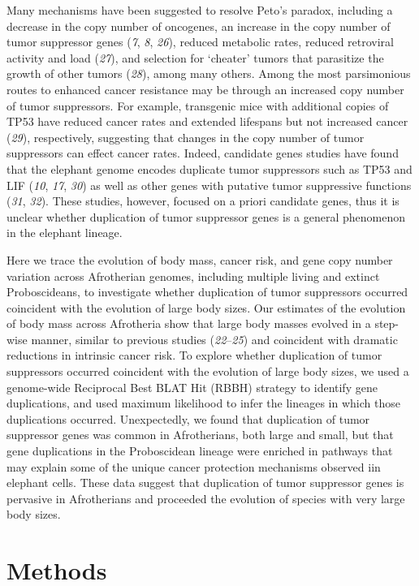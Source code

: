 \documentclass[]{elsarticle} %
\begin{document}
Many mechanisms have been suggested to resolve Peto's paradox, including a decrease in the copy number of oncogenes, an increase in the copy number of tumor suppressor genes (\emph{7}, \emph{8}, \emph{26}), reduced metabolic rates, reduced retroviral activity and load (\emph{27}), and selection for `cheater' tumors that parasitize the growth of other tumors (\emph{28}), among many others. Among the most parsimonious routes to enhanced cancer resistance may be through an increased copy number of tumor suppressors. For example, transgenic mice with additional copies of TP53 have reduced cancer rates and extended lifespans but not increased cancer (\emph{29}), respectively, suggesting that changes in the copy number of tumor suppressors can effect cancer rates. Indeed, candidate genes studies have found that the elephant genome encodes duplicate tumor suppressors such as TP53 and LIF (\emph{10}, \emph{17}, \emph{30}) as well as other genes with putative tumor suppressive functions (\emph{31}, \emph{32}). These studies, however, focused on a priori candidate genes, thus it is unclear whether duplication of tumor suppressor genes is a general phenomenon in the elephant lineage.

Here we trace the evolution of body mass, cancer risk, and gene copy number variation across Afrotherian genomes, including multiple living and extinct Proboscideans, to investigate whether duplication of tumor suppressors occurred coincident with the evolution of large body sizes. Our estimates of the evolution of body mass across Afrotheria show that large body masses evolved in a step-wise manner, similar to previous studies (\emph{22}--\emph{25}) and coincident with dramatic reductions in intrinsic cancer risk. To explore whether duplication of tumor suppressors occurred coincident with the evolution of large body sizes, we used a genome-wide Reciprocal Best BLAT Hit (RBBH) strategy to identify gene duplications, and used maximum likelihood to infer the lineages in which those duplications occurred. Unexpectedly, we found that duplication of tumor suppressor genes was common in Afrotherians, both large and small, but that gene duplications in the Proboscidean lineage were enriched in pathways that may explain some of the unique cancer protection mechanisms observed iin elephant cells. These data suggest that duplication of tumor suppressor genes is pervasive in Afrotherians and proceeded the evolution of species with very large body sizes.

\hypertarget{methods}{%
\section{Methods}\label{methods}}
\end{document}
